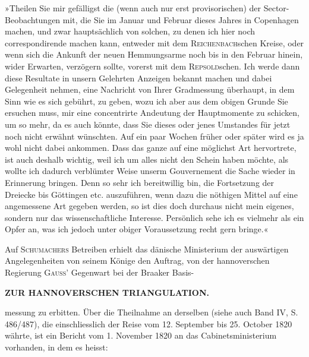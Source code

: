 \par\noindent\hspace*{\parindent}»Theilen Sie mir gefälligst die (wenn auch nur erst provisorischen)  der Sector-Beobachtungen mit, die Sie im Januar und Februar dieses Jahres in Copenhagen machen, und zwar hauptsächlich von solchen, zu denen ich hier noch correspondirende machen kann, entweder mit dem \textsc{Reichenbach}schen Kreise, oder wenn sich die Ankunft der neuen Hemmungsarme noch bis in den Februar hinein, wider Erwarten, verzögern sollte, vorerst mit dem \textsc{Repsold}schen. Ich werde dann diese Resultate in unsern Gelehrten Anzeigen bekannt machen und dabei Gelegenheit nehmen, eine Nachricht von Ihrer Gradmessung überhaupt, in dem Sinn wie es sich gebührt, zu geben, wozu ich aber aus dem obigen Grunde Sie ersuchen muss, mir eine concentrirte Andeutung der Hauptmomente zu schicken, um so mehr, da es auch könnte, dass Sie dieses oder jenes Umstandes für jetzt noch nicht erwähnt wünschten. Auf ein paar Wochen früher oder später wird es ja wohl nicht dabei ankommen. Dass das ganze auf eine möglichst  Art hervortrete, ist auch  deshalb wichtig, weil ich um alles nicht den Schein haben möchte, als wollte ich dadurch verblümter Weise unserm Gouvernement die Sache wieder in Erinnerung bringen. Denn so sehr ich bereitwillig bin, die Fortsetzung der Dreiecke bis Göttingen etc. auszuführen, wenn dazu die nöthigen Mittel auf eine angemessene Art gegeben werden, so ist dies doch durchaus nicht mein eigenes, sondern nur das wissenschaftliche Interesse. Persönlich sehe ich es vielmehr als ein Opfer an, was ich jedoch unter obiger Voraussetzung recht gern bringe.«

\par\noindent\hspace*{\parindent}Auf \textsc{Schumachers} Betreiben erhielt das dänische Ministerium der auswärtigen Angelegenheiten von seinem Könige den Auftrag, von der hannoverschen Regierung \textsc{Gauss}' Gegenwart bei der Braaker Basis-\par

\clearpage
\noindent\null\hfill\textbf{ZUR HANNOVERSCHEN TRIANGULATION.}\hfill{}\par\medskip
\noindent messung zu erbitten. Über die Theilnahme an derselben (siehe auch Band IV, S. 486/487), die einschliesslich der Reise vom 12. September bis 25. October 1820 währte, ist ein Bericht vom 1. November 1820 an das Cabinetsministerium vorhanden, in dem es heisst:

